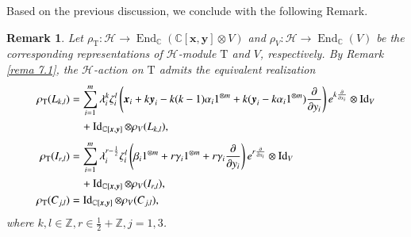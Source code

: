 \documentclass[12pt,reqno]{amsart}
\def\Z{\mathbb{Z}}
\def\C{\mathbb{C}}
\numberwithin{equation}{section}
\newtheorem{rema}[theo]{Remark}
\begin{document}
Based on the previous discussion, we conclude with the following Remark.
\begin{rema}

Let  $\rho_{\mathrm{T}}:\mathcal H\to\operatorname{End}_{\mathbb C}(\C[\boldsymbol{x},\boldsymbol{y}]\otimes V)$ and $\rho_{V}:\mathcal H\to\operatorname{End}_{\mathbb C}(V)$ be the corresponding representations of $\mathcal H$-module $\mathrm{T}$ and $V$, respectively. By Remark \ref{rema 7.1}, the $\mathcal H$-action on $\mathrm{T}$ admits the equivalent realization
\begin{equation*}\label{formula 5.4.2.4}
\aligned
\rho_{\mathrm{T}}(L_{k,l})
&=\sum_{i=1}^{m}\lambda_i^k\zeta_i^l
\left(
\boldsymbol{x}_i+k\boldsymbol{y}_i-k(k-1)\alpha_i1^{\otimes m}
+k(\boldsymbol{y}_i-k\alpha_i1^{\otimes m})\frac{\partial}{\partial{y_i}}
\right)
e^{k\frac{\partial}{\partial{x_i}}}\otimes\operatorname{Id}_V\\
&\quad+\operatorname{Id}_{\C[\boldsymbol{x},\boldsymbol{y}]}\otimes\rho_V(L_{k,l}),\\[1mm]
\rho_{\mathrm{T}}(I_{r,l})
&=\sum_{i=1}^{m}\lambda_i^{r-\frac12}\zeta_i^l
\left(
\beta_i1^{\otimes m}+r\gamma_i1^{\otimes m}+r\gamma_i\frac{\partial}{\partial{y_i}}
\right)
e^{r\frac{\partial}{\partial{x_i}}}\otimes\operatorname{Id}_V\\
&\quad+\operatorname{Id}_{\C[\boldsymbol{x},\boldsymbol{y}]}\otimes\rho_V(I_{r,l}),\\
\rho_{\mathrm{T}}(C_{j,l})
&=\operatorname{Id}_{\C[\boldsymbol{x},\boldsymbol{y}]}\otimes \rho_V(C_{j,l}),
\endaligned 
\end{equation*}
where $k,l\in\Z,r\in\frac{1}{2}+\Z,j=1,3$.

    
\end{rema}























\appendix
\end{document}
